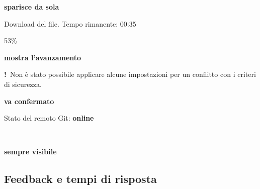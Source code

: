 \begin{center}
\begin{minipage}[t]{0.2\linewidth}\centering
  \par\smallskip
  {\scriptsize\bfseries sparisce da sola}
\end{minipage}\hfill
\begin{minipage}[t]{0.25\linewidth}\centering
  \begin{tcolorbox}[persist]
    Download del file. Tempo rimanente: 00:35\par
    \hfill 53\%
  \end{tcolorbox}\par\smallskip
  {\scriptsize\bfseries mostra l'avanzamento}
\end{minipage}\hfill
\begin{minipage}[t]{0.27\linewidth}\centering
  \begin{tcolorbox}[persist]
    \textcolor{q5}{\textbf{!}}\ Non è stato possibile applicare alcune impostazioni per un conflitto con i criteri di
    sicurezza.\par{\hfill{}\par}
  \end{tcolorbox}\par\smallskip
  {\scriptsize\bfseries va confermato}
\end{minipage}\hfill
\begin{minipage}[t]{0.22\linewidth}\centering
  \begin{tcolorbox}[persist, halign=center]
    Stato del remoto Git: \textcolor{swred}{\textbf{online}}\par\smallskip
    \ 
  \end{tcolorbox}\par\smallskip
  {\scriptsize\bfseries sempre visibile}
\end{minipage}
\end{center}

\subsection{Feedback e tempi di risposta}

